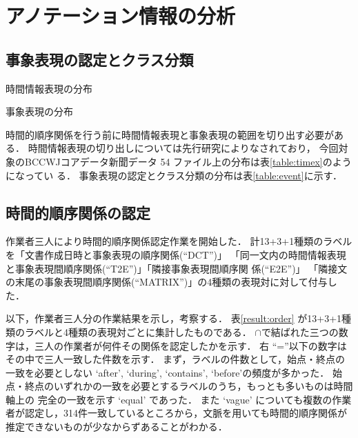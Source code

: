 \documentclass[japanese]{jnlp_1.4}
\newcommand{\modified}[1]{}
\begin{document}
\section{アノテーション情報の分析}
\label{sec:analysis}

\subsection{事象表現の認定とクラス分類}

\begin{table}[b]
\begin{minipage}[t]{192pt}
\caption{時間情報表現の分布}
\label{table:timex}

\end{minipage}  
\hfill
\begin{minipage}[t]{220pt}
\caption{事象表現の分布}
\label{table:event}

\end{minipage}
\end{table}

時間的順序関係を行う前に時間情報表現と事象表現の範囲を切り出す必要がある．
時間情報表現の切り出しについては先行研究\cite{小西-2013}によりなされており，
今回対象のBCCWJコアデータ新聞データ 54 ファイル上の分布は表\ref{table:timex}のようになってい
る．
事象表現の認定とクラス分類の分布は表\ref{table:event}に示す．



\subsection{時間的順序関係の認定}

作業者三人により時間的順序関係認定作業を開始した．
計13+3+1種類のラベルを「文書作成日時と事象表現の順序関係(``DCT'')」 
「同一文内の時間情報表現と事象表現間順序関係(``T2E'')」「隣接事象表現間順序関
  係(``E2E'')」
「隣接文の末尾の事象表現間順序関係(``MATRIX'')」の4種類の表現対に対して付与した．

以下，作業者三人分の作業結果を示し，考察する．
表\ref{result:order} が13+3+1種類のラベルと4種類の表現対ごとに集計したものである．
$\cap$で結ばれた三つの数字は，三人の作業者が何件その関係を認定したかを示す．
右 ``=''以下の数字はその中で三人\modified{が}一致した件数を示す．
まず，\modified{一致した}ラベルの件数として，始点・終点の一致を必要としない `after',
`during', `contains', `before'の頻度が多かった．
始点・終点のいずれかの一致を必要とするラベルのうち，もっとも\modified{一致件数が}多いものは時間軸上の
完全の一致を示す `equal' であった．
また `vague' についても複数の作業者が認定し，314件一致しているところから，文脈を用いても時間的順序関係が推定できないものが少なからずあることがわかる．
\end{document}
